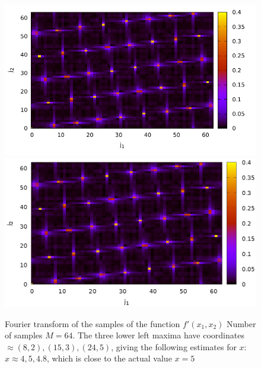 \begin{figure}
\centering

\ifpdf
\includegraphics[angle=0]
{elliptic/picellipticdiscretlog2.pdf}
\else
\includegraphics[angle=0]
{elliptic/picellipticdiscretlog2.eps}
\fi

\caption{Fourier transform of the samples of the function 
$f'(x_1, x_2)$
Number of samples $M=64$. The three lower left maxima have coordinates $\approx (8,2), (15,3), (24,5)$, giving the following estimates for $x$: $x \approx 4, 5, 4.8$,
which is close to the actual value $x = 5$
} 
\label{fig:quantcomp:dle2}
\end{figure}
